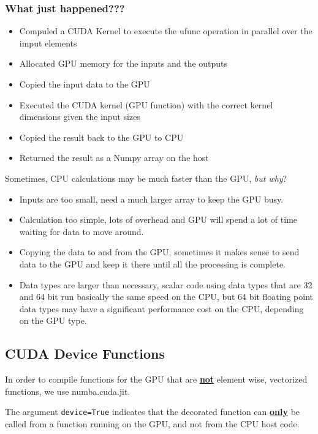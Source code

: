 \documentclass{article}
\begin{document}
\subsubsection{What just happened???}
\begin{itemize}
	\item Compuled a CUDA Kernel to execute the ufunc operation in parallel over the imput elements
	\item Allocated GPU memory for the inputs and the outputs
	\item Copied the input data to the GPU
	\item Executed the CUDA kernel (GPU function) with the correct kernel dimensions given the input sizes
	\item Copied the result back to the GPU to CPU
	\item Returned the result as a Numpy array on the host
\end{itemize}

Sometimes, CPU calculations may be much faster than the GPU, \textit{but why}?

\begin{itemize}
	\item Inputs are too small, need a much larger array to keep the GPU busy.
	\item Calculation too simple, lots of overhead and GPU will spend a lot of time waiting for data to move around.
	\item Copying the data to and from the GPU, sometimes it makes sense to send data to the GPU and keep it there until all the processing is complete.
	\item Data types are larger than necessary, scalar code using data types that are 32 and 64 bit run basically the same speed on the CPU, but 64 bit floating point data types may have a significant performance cost on the CPU, depending on the GPU type.

\end{itemize}

\subsection{CUDA Device Functions}

In order to compile functions for the GPU that are \textbf{\underline{not}} element wise, vectorized functions, we use numba.cuda.jit.


The argument \verb_device=True_ indicates that the decorated function can \textbf{\underline{only}} be called from a function running on the GPU, and not from the CPU host code.
\end{document}
